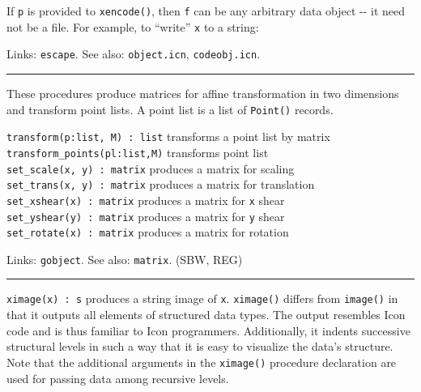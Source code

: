 If \texttt{p} is provided to \texttt{xencode()}, then \texttt{f} can be any
arbitrary data object -{}- it need not be a file. For example, to
``write'' \texttt{x} to a string:


Links: \texttt{escape}. See also: \texttt{object.icn},
\texttt{codeobj.icn}.

\vspace{0.25cm}\hrule{}

These procedures produce matrices for affine transformation in two
dimensions and transform point lists. A point list is a list of
\texttt{Point()} records.

\texttt{transform(p:list, M) : list} transforms a point list by
matrix\\
\texttt{transform\_points(pl:list,M)} transforms point list\\
\texttt{set\_scale(x, y) : matrix} produces a matrix for scaling\\
\texttt{set\_trans(x, y) : matrix} produces a matrix for
translation\\
\texttt{set\_xshear(x) : matrix} produces a matrix for \texttt{x} shear\\
\texttt{set\_yshear(y) : matrix} produces a matrix for \texttt{y} shear\\
\texttt{set\_rotate(x) : matrix} produces a matrix for rotation

Links: \texttt{gobject}. See also: \texttt{matrix}. (SBW, REG)

\vspace{0.25cm}\hrule{}

\texttt{ximage(x) : s} produces a string image of \texttt{x}.
\texttt{ximage()} differs from \texttt{image()} in that it outputs all
elements of structured data types. The output
resembles Icon code and is thus familiar to Icon programmers.
Additionally, it indents successive structural levels in such a way
that it is easy to visualize the data's structure.
Note that the additional arguments in the \texttt{ximage()} procedure
declaration are used for passing data among recursive levels. 

